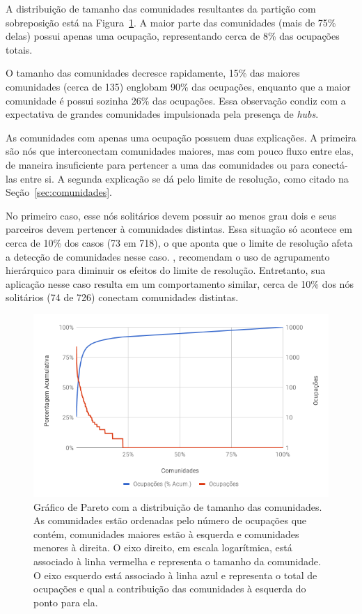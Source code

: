 \documentclass[
  article,
  11pt,
  a4paper,
  english,
  brazil,
  sumario=tradicional]{abntex2}
\begin{document}
A distribuição de tamanho das comunidades resultantes da partição com sobreposição está na Figura~\ref{fig:pareto-comunidades}. A maior parte das comunidades (mais de 75\% delas) possui apenas uma ocupação, representando cerca de 8\% das ocupações totais.

O tamanho das comunidades decresce rapidamente, 15\% das maiores comunidades (cerca de 135) englobam 90\% das ocupações, enquanto que a maior comunidade é possui sozinha 26\% das ocupações. Essa observação condiz com a expectativa de grandes comunidades impulsionada pela presença de \textit{hubs}.

As comunidades com apenas uma ocupação possuem duas explicações. A primeira são nós que interconectam comunidades maiores, mas com pouco fluxo entre elas, de maneira insuficiente para pertencer a uma das comunidades ou para conectá-las entre si. A segunda explicação se dá pelo limite de resolução, como citado na Seção~\ref{sec:comunidades}.

No primeiro caso, esse nós solitários devem possuir ao menos grau dois e seus parceiros devem pertencer à comunidades distintas. Essa situação só acontece em cerca de 10\% dos casos (73 em 718), o que aponta que o limite de resolução afeta a detecção de comunidades nesse caso. , recomendam o uso de agrupamento hierárquico para diminuir os efeitos do limite de resolução. Entretanto, sua aplicação nesse caso resulta em um comportamento similar, cerca de 10\% dos nós solitários (74 de 726) conectam comunidades distintas.

\begin{figure}[htb]
  \centering
  \includegraphics[width=0.9\linewidth]{pareto-comunidades.png}
  \caption{Gráfico de Pareto com a distribuição de tamanho das comunidades. As comunidades estão ordenadas pelo número de ocupações que contém, comunidades maiores estão à esquerda e comunidades menores à direita. O eixo direito, em escala logarítmica, está associado à linha vermelha e representa o tamanho da comunidade. O eixo esquerdo está associado à linha azul e representa o total de ocupações e qual a contribuição das comunidades à esquerda do ponto para ela.}
  \label{fig:pareto-comunidades}
\end{figure}
\end{document}
